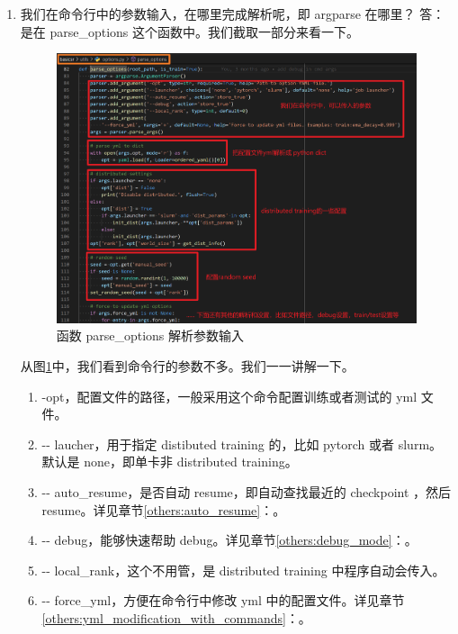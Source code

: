 \documentclass[../main.tex]{subfiles}
\begin{document}
\begin{enumerate}
    \item 我们在命令行中的参数输入，在哪里完成解析呢，即 argparse 在哪里？
          答：是在 parse\_options 这个函数中。我们截取一部分来看一下。

          \begin{figure}[ht]
              \begin{center}
                  \vspace{-0.2cm}
                  \includegraphics[width=0.85\linewidth]{figures/getting_start_parse_options.png}
                  \vspace{-0.3cm}
                  \caption{函数 parse\_options 解析参数输入}
                  \label{fig:getting_start_parse_options}
              \end{center}
              \vspace{-0.5cm}
          \end{figure}

          从图\ref{fig:getting_start_parse_options}中，我们看到命令行的参数不多。我们一一讲解一下。

          \begin{enumerate}
              \item {-}opt，配置文件的路径，一般采用这个命令配置训练或者测试的 yml 文件。
              \item {-}{-} laucher，用于指定 distibuted training 的，比如 pytorch 或者 slurm。默认是 none，即单卡非 distributed training。
              \item {-}{-} auto\_resume，是否自动 resume，即自动查找最近的 checkpoint ，然后 resume。详见章节\ref{others:auto_resume}：。
              \item {-}{-} debug，能够快速帮助 debug。详见章节\ref{others:debug_mode}：。
              \item {-}{-} local\_rank，这个不用管，是 distributed training 中程序自动会传入。
              \item {-}{-} force\_yml，方便在命令行中修改 yml 中的配置文件。详见章节\ref{others:yml_modification_with_commands}：。
          \end{enumerate}



\end{enumerate}
\end{document}
